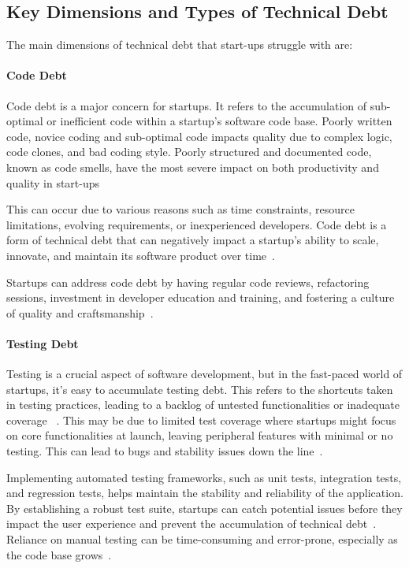 \subsection{Key Dimensions and Types of Technical Debt}
The main dimensions of technical debt that start-ups struggle with are:

\paragraph{Code Debt} 
Code debt is a major concern for startups.
It refers to the accumulation of sub-optimal or inefficient code within a startup's software code base.
Poorly written code, novice coding and sub-optimal code impacts quality due to complex logic, code clones, and bad coding style.
Poorly structured and documented code, known as code smells, have the most severe impact on both productivity and quality in start-ups~\cite{Klotins2018/3183519.3183539}

This can occur due to various reasons such as time constraints, resource limitations, evolving requirements, or inexperienced developers.
Code debt is a form of technical debt that can negatively impact a startup's ability to scale, innovate, and maintain its software product over time~\cite{FowlerBottlenecks, Qualityv77:online}.

Startups can address code debt by having regular code reviews, refactoring sessions, investment in developer education and training, and fostering a culture of quality and craftsmanship~\cite{10043622, Acknowle63:online}.

\paragraph{Testing Debt}
Testing is a crucial aspect of software development, but in the fast-paced world of startups, it's easy to accumulate testing debt.
This refers to the shortcuts taken in testing practices, leading to a backlog of untested functionalities or inadequate coverage ~\cite{Howtohan98:online}.
This may be due to limited test coverage where startups might focus on core functionalities at launch, leaving peripheral features with minimal or no testing.
This can lead to bugs and stability issues down the line~\cite{Totalqua26:online}.

Implementing automated testing frameworks, such as unit tests, integration tests, and regression tests, helps maintain the stability and reliability of the application.
By establishing a robust test suite, startups can catch potential issues before they impact the user experience and prevent the accumulation of technical debt~\cite{TheImpac54:online}.
Reliance on manual testing can be time-consuming and error-prone, especially as the code base grows~\cite{Howtohan98:online}.

